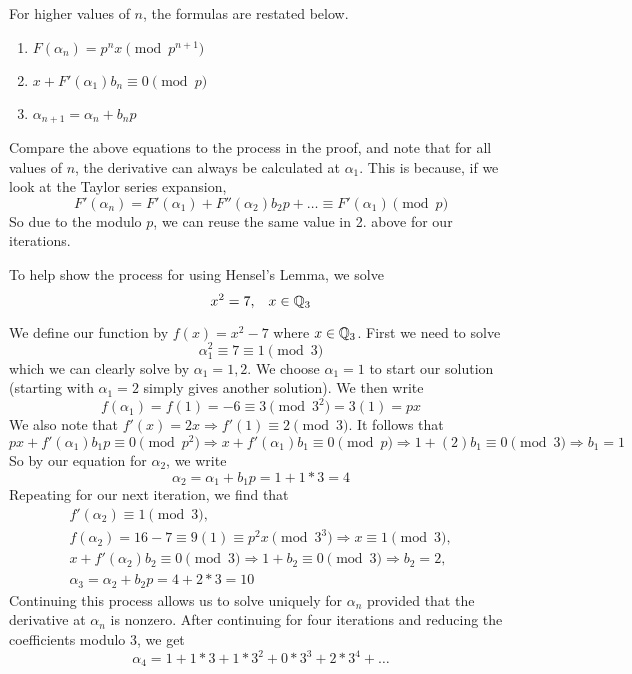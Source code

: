 \documentclass[a4paper]{article}
\begin{document}
For higher values of $n$, the formulas are restated below.
\begin{enumerate}
  \item $F(\alpha_n)=p^nx\pmod{p^{n+1}}$
  \item $x+F'(\alpha_1)b_n\equiv0\pmod p$
  \item $\alpha_{n+1}=\alpha_n+b_np$
\end{enumerate}

Compare the above equations to the process in the proof, and note that
for all values of $n$, the derivative can always be calculated at 
$\alpha_1$.  This is because, if we look at the Taylor series expansion,
\[
	F'(\alpha_n)=F'(\alpha_1)+F''(\alpha_2)b_2p+\dots\equiv 
    F'(\alpha_1)\pmod{p}
\]
So due to the modulo $p$, we can reuse the same value in 2. above for our 
iterations.

\begin{example}
  To help show the process for using Hensel's Lemma, we solve
  \[
  	x^2=7,\;\;\;x\in\mathbb Q_3
  \]
\end{example}
\begin{solution}
We define our function by $f(x)=x^2-7$ where $x\in\mathbb Q_3$.  First we
need to solve
\[
	\alpha_1^2\equiv 7\equiv1\pmod 3
\]
which we can clearly solve by $\alpha_1=1,2$.  We choose $\alpha_1=1$ to
start our solution (starting with $\alpha_1=2$ simply gives another
solution).  We then write
\[
  f(\alpha_1)=f(1)=-6\equiv3\pmod{3^2}=3(1)=px
\]
We also note that $f'(x)=2x\Rightarrow f'(1)\equiv2\pmod 3$.  It follows 
that
\[
  px+f'(\alpha_1)b_1p\equiv0\pmod{p^2}\Rightarrow x+f'(\alpha_1)b_1
  \equiv0\pmod p\Rightarrow 1+(2)b_1\equiv0\pmod 3\Rightarrow b_1=1
\]
So by our equation for $\alpha_2$, we write 
\[
  \alpha_2=\alpha_1+b_1p=1+1*3=4
\]
Repeating for our next iteration, we find that 
\[
  \begin{gathered}
    f'(\alpha_2)\equiv1\pmod 3,\\
    f(\alpha_2)=16-7\equiv9(1)\equiv p^2x\pmod{3^3}\Rightarrow 
    x\equiv1\pmod 3,\\
    x+f'(\alpha_2)b_2\equiv0\pmod 3\Rightarrow 
    1+b_2\equiv0\pmod 3\Rightarrow
    b_2=2,\\
    \alpha_3=\alpha_2+b_2p=4+2*3=10
  \end{gathered}
\]
Continuing this process allows us to solve uniquely for $\alpha_n$ 
provided that the derivative at $\alpha_n$ is nonzero.  After continuing 
for four iterations and reducing the coefficients modulo 3, we get
\[
  \alpha_4=1+1*3+1*3^2+0*3^3+2*3^4+\dots
\]
\end{solution}
\end{document}
